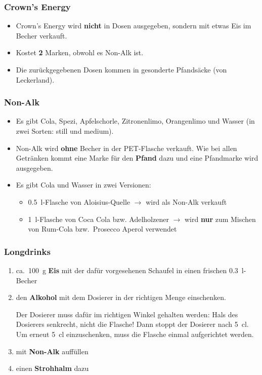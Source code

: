 \subsubsection{Crown's Energy}
\begin{itemize}
  \item Crown's Energy wird \textbf{nicht} in Dosen ausgegeben, sondern mit etwas Eis im Becher verkauft.
  \item Kostet \textbf{2} Marken, obwohl es Non-Alk ist.
  \item Die zurückgegebenen Dosen kommen in gesonderte Pfandsäcke (von Leckerland).
\end{itemize}
\subsubsection{Non-Alk}
\begin{itemize}
  \item Es gibt Cola, Spezi, Apfelschorle, Zitronenlimo, Orangenlimo und Wasser (in zwei Sorten: still und medium).
  \item Non-Alk wird \textbf{ohne} Becher in der PET-Flasche verkauft. Wie bei allen Getränken kommt eine Marke für den \textbf{Pfand} dazu und eine Pfandmarke wird ausgegeben.
  \item Es gibt Cola und Wasser in zwei Versionen:
    \begin{itemize}
      \item \SI{0.5}{\litre}-Flasche von Aloisius-Quelle $\rightarrow$ wird als Non-Alk verkauft
      \item \SI{1}{\litre}-Flasche von Coca Cola bzw. Adelholzener $\rightarrow$ wird \textbf{nur} zum Mischen von Rum-Cola bzw.\ Prosecco Aperol verwendet
    \end{itemize}
\end{itemize}
\subsubsection{Longdrinks}
\begin{enumerate}
  \item ca.\ \SI{100}{\gram} \textbf{Eis} mit der dafür vorgesehenen Schaufel in einen frischen \SI{0.3}{\litre}-Becher
  \item den \textbf{Alkohol} mit dem Dosierer in der richtigen Menge einschenken.
    
    Der Dosierer muss dafür im richtigen Winkel gehalten werden: Hals des Dosierers senkrecht, nicht die Flasche! Dann stoppt der Dosierer nach \SI{5}{\centi\litre}. Um erneut \SI{5}{\centi\litre} einzuschenken, muss die Flasche einmal aufgerichtet werden.
  \item mit \textbf{Non-Alk} auffüllen
  \item einen \textbf{Strohhalm} dazu
\end{enumerate}

